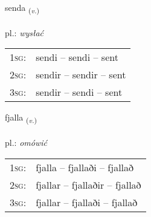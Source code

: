 \documentclass[frontgrid, backgrid]{flacards}\usepackage[]{graphicx}\usepackage[]{xcolor}
\begin{document}
\renewcommand{\flhead}{\vskip5pt \fboxsep=0pt {\small\bfseries\footnotesize Sagnorð | czasownik}}
\renewcommand{\fcfoot}{\vskip5pt \fboxsep=0pt \hspace{2pt}{\small\bfseries\footnotesize 1K}}

\renewcommand{\blhead}{\vskip5pt {\small\bfseries\footnotesize Sagnorð | czasownik }}
\renewcommand{\bcfoot}{\vskip5pt \hspace{2pt}{\small\bfseries\footnotesize 1K}}


{senda \small{\textsubscript{(\textit{v.})}} \\[1ex] %
\textphonetic{[sɛnta]} \\
pl.: \emph{wysłać} \\  [2ex]
\renewcommand*{\arraystretch}{0.8}
\begin{tabular}{p{1cm}l}
\textsc{1sg}: & sendi -- sendi -- sent \\ 
\textsc{2sg}: & sendir -- sendir -- sent \\ 
\textsc{3sg}: & sendir -- sendi -- sent \\ 
\end{tabular}
}

\renewcommand{\flhead}{\vskip5pt \fboxsep=0pt {\small\bfseries\footnotesize Sagnorð | czasownik}}
\renewcommand{\fcfoot}{\vskip5pt \fboxsep=0pt \hspace{2pt}{\small\bfseries\footnotesize 1K}}

\renewcommand{\blhead}{\vskip5pt {\small\bfseries\footnotesize Sagnorð | czasownik }}
\renewcommand{\bcfoot}{\vskip5pt \hspace{2pt}{\small\bfseries\footnotesize 1K}}


{fjalla \small{\textsubscript{(\textit{v.})}} \\[1ex] %
\textphonetic{[fjatla]} \\
pl.: \emph{omówić} \\  [2ex]
\renewcommand*{\arraystretch}{0.8}
\begin{tabular}{p{1cm}l}
\textsc{1sg}: & fjalla -- fjallaði -- fjallað \\ 
\textsc{2sg}: & fjallar -- fjallaðir -- fjallað \\ 
\textsc{3sg}: & fjallar -- fjallaði -- fjallað \\ 
\end{tabular}
}
\end{document}
